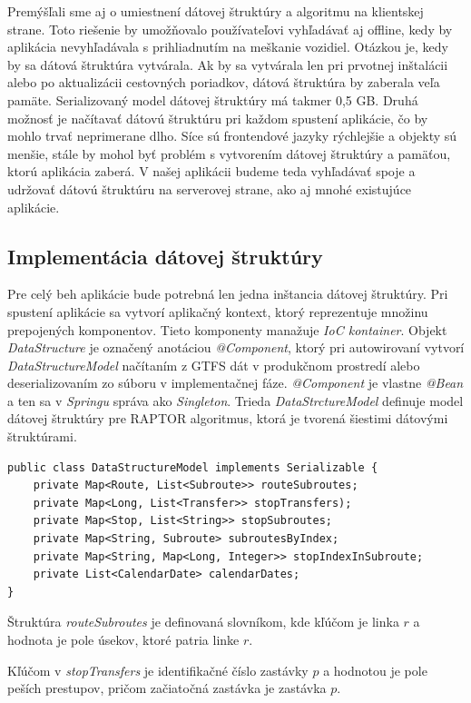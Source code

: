 Premýšľali sme aj o umiestnení dátovej štruktúry a algoritmu na klientskej strane. Toto riešenie by umožňovalo používateľovi vyhľadávať aj offline, kedy by aplikácia nevyhľadávala s prihliadnutím na meškanie vozidiel. Otázkou je, kedy by sa dátová štruktúra vytvárala. Ak by sa vytvárala len pri prvotnej inštalácii alebo po aktualizácii cestovných poriadkov, dátová štruktúra by zaberala veľa pamäte. Serializovaný model dátovej štruktúry má takmer 0,5 GB. Druhá možnosť je načítavať dátovú štruktúru pri každom spustení aplikácie, čo by mohlo trvať neprimerane dlho. Síce sú frontendové jazyky rýchlejšie a objekty sú menšie, stále by mohol byť problém s vytvorením dátovej štruktúry a pamäťou, ktorú aplikácia zaberá. V našej aplikácii budeme teda vyhľadávať spoje a udržovať dátovú štruktúru na serverovej strane, ako aj mnohé existujúce aplikácie.

\subsection{Implementácia dátovej štruktúry}
Pre celý beh aplikácie bude potrebná len jedna inštancia dátovej štruktúry. Pri spustení aplikácie sa vytvorí aplikačný kontext, ktorý reprezentuje množinu prepojených komponentov. Tieto komponenty manažuje \textit{IoC kontainer}. Objekt \textit{DataStructure} je označený anotáciou \textit{@Component}, ktorý pri autowirovaní vytvorí \textit{DataStructureModel} načítaním z GTFS dát v produkčnom prostredí alebo deserializovaním zo súboru v implementačnej fáze.\textit{ @Component }je vlastne \textit{@Bean} a ten sa v \textit{Springu} správa ako \textit{Singleton}. 
Trieda \textit{DataStrctureModel} definuje model dátovej štruktúry pre RAPTOR algoritmus, ktorá je tvorená šiestimi dátovými štruktúrami. 
\begin{lstlisting}
public class DataStructureModel implements Serializable {
    private Map<Route, List<Subroute>> routeSubroutes;
    private Map<Long, List<Transfer>> stopTransfers);
    private Map<Stop, List<String>> stopSubroutes;
    private Map<String, Subroute> subroutesByIndex;
    private Map<String, Map<Long, Integer>> stopIndexInSubroute;
    private List<CalendarDate> calendarDates;
}
\end{lstlisting}
Štruktúra \textit{routeSubroutes} je definovaná slovníkom, kde kľúčom je linka $r$ a hodnota je pole úsekov, ktoré patria linke $r$. 

Kľúčom v \textit{stopTransfers} je identifikačné číslo zastávky $p$ a hodnotou je pole peších prestupov, pričom začiatočná zastávka je zastávka $p$. 

